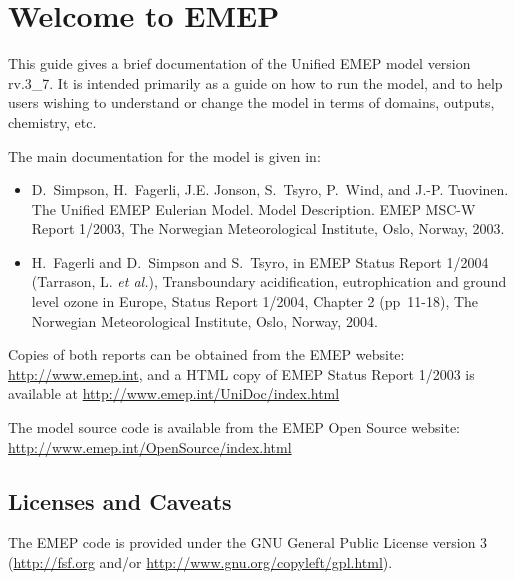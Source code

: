 
\chapter{Welcome to EMEP }

This guide gives a brief documentation of the Unified EMEP model
version rv.3\_7.
It is intended primarily as a guide on how to run the model, and
to help users wishing to understand or change 
the model in terms of domains, outputs, chemistry, etc.


The main documentation for the model is given in:

\begin{itemize}
\item
D.~Simpson, H.~Fagerli, J.E. Jonson, S.~Tsyro, P.~Wind, and J.-P. Tuovinen.
{The Unified EMEP Eulerian Model. Model Description}.
EMEP MSC-W Report 1/2003, The Norwegian
Meteorological Institute, Oslo, Norway, 2003.
\item
H.~Fagerli and D.~Simpson and S.~Tsyro,
        in EMEP Status Report 1/2004 (Tarrason, L. {\sl et al.}), Transboundary acidification, eutrophication
        and ground level ozone in Europe, Status Report 1/2004, Chapter 2 (pp~11-18), The
        Norwegian Meteorological Institute, Oslo, Norway, 2004. 

\end{itemize}

 Copies of both reports can be obtained from the EMEP website: \\
\url{http://www.emep.int}, and a HTML copy of EMEP Status Report
1/2003 is
available at 
\url{http://www.emep.int/UniDoc/index.html}

The model source code is available from the  EMEP Open Source
  website: \url{http://www.emep.int/OpenSource/index.html}

\newpage

\section{Licenses and Caveats}

The EMEP code is provided under the GNU General Public License version 3
(\url{http://fsf.org} and/or
\url{http://www.gnu.org/copyleft/gpl.html}).

